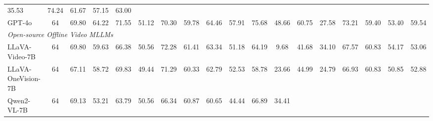 \begin{table}[ht]
{\begin{tabular}{lccccccccccccccccc}
              {35.53} &
              {74.24} &
              \multicolumn{1}{c|}{{61.67}} &
              \multicolumn{1}{c|}{{57.15}} &
              {63.00} \\
            \multicolumn{1}{l|}{GPT-4o \cite{openai2024gpt4o}} &
              \multicolumn{1}{c|}{64} &
              69.80 &
              64.22 &
              71.55 &
              51.12 &
              {70.30} &
              \multicolumn{1}{c|}{59.78} &
              \multicolumn{1}{c|}{64.46} &
              57.91 &
              75.68 &
              \multicolumn{1}{c|}{48.66} &
              \multicolumn{1}{c|}{60.75} &
              27.58 &
              73.21 &
              \multicolumn{1}{c|}{59.40} &
              \multicolumn{1}{c|}{53.40} &
              59.54 \\ \midrule
            \multicolumn{18}{l}{\textit{Open-source Offline Video MLLMs}} \\ \midrule
            \multicolumn{1}{l|}{LLaVA-Video-7B \cite{zhang2024llavavideo}} &
              \multicolumn{1}{c|}{64} &
              69.80 &
              59.63 &
              66.38 &
              50.56 &
              72.28 &
              \multicolumn{1}{c|}{61.41} &
              \multicolumn{1}{c|}{63.34} &
              51.18 &
              64.19 &
              \multicolumn{1}{c|}{9.68} &
              \multicolumn{1}{c|}{41.68} &
              34.10 &
              {67.57} &
              \multicolumn{1}{c|}{60.83} &
              \multicolumn{1}{c|}{{54.17}} &
              53.06 \\
            \multicolumn{1}{l|}{LLaVA-OneVision-7B \cite{li2024llavaov}} &
              \multicolumn{1}{c|}{64} &
              67.11 &
              58.72 &
              69.83 &
              49.44 &
              71.29 &
              \multicolumn{1}{c|}{60.33} &
              \multicolumn{1}{c|}{62.79} &
              52.53 &
              58.78 &
              \multicolumn{1}{c|}{23.66} &
              \multicolumn{1}{c|}{44.99} &
              24.79 &
              66.93 &
              \multicolumn{1}{c|}{60.83} &
              \multicolumn{1}{c|}{50.85} &
              52.88 \\
            \multicolumn{1}{l|}{Qwen2-VL-7B \cite{qwen2vl}} &
              \multicolumn{1}{c|}{64} &
              69.13 &
              53.21 &
              63.79 &
              50.56 &
              66.34 &
              \multicolumn{1}{c|}{60.87} &
              \multicolumn{1}{c|}{60.65} &
              44.44 &
              66.89 &
              \multicolumn{1}{c|}{34.41} &

\end{tabular}}
\end{table}

